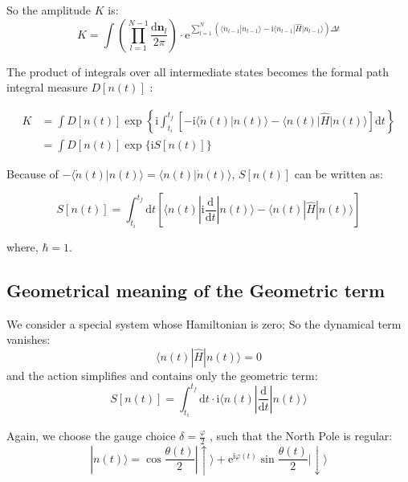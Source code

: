 So the amplitude $K$ is:
\begin{equation}
K = \int \left( \prod_{l=1}^{N-1} \frac{\mathrm{d}\bm{n}_l}{2\pi} \right) \cdot \mathrm{e}^{\sum_{l=1}^N (\langle \dot{n}_{l-1} | n_{l-1}\rangle - \mathrm{i} \langle n_{l-1} | \hat{H} | n_{l-1}\rangle) \Delta t}
\end{equation}

The product of integrals over all intermediate states becomes the formal path integral measure $D[n(t)]$ :

\begin{equation}
\begin{aligned}
K &= \int D[n(t)] \exp \left\{ \mathrm{i} \int_{t_i}^{t_f} [-\mathrm{i} \langle \dot{n}(t)|n(t)\rangle - \langle n(t)|\hat{H}|n(t)\rangle] \mathrm{d}t \right\} \\
&= \int D[n(t)] \exp \{ \mathrm{i} S[n(t)] \}
\end{aligned}
\end{equation}

Because of $-\langle \dot{n}(t)|n(t)\rangle = \langle n(t)|\dot{n}(t)\rangle$, $S[n(t)]$ can be written as:

\begin{equation}
S[n(t)] = \int_{t_i}^{t_f} \mathrm{d}t \left[ \langle n(t)| \mathrm{i} \frac{\mathrm{d}}{\mathrm{d}t} |n(t)\rangle - \langle n(t)|\hat{H}|n(t)\rangle \right]
\end{equation}

where, $\hbar=1$.



\subsection{Geometrical meaning of the Geometric term}

We consider a special system whose Hamiltonian is zero; So the dynamical term vanishes:
\begin{equation}
\langle n(t)|\hat{H}|n(t)\rangle = 0
\end{equation}
and the action simplifies and contains only the geometric term:
\begin{equation}
S[n(t)] = \int_{t_i}^{t_f} \mathrm{d}t \cdot \mathrm{i} \langle n(t)| \frac{\mathrm{d}}{\mathrm{d}t} |n(t)\rangle
\end{equation}

Again, we choose the gauge choice $\delta=\frac{\varphi}{2}$ , such that the North Pole is regular:
\begin{equation}
|n(t)\rangle = \cos\frac{\theta(t)}{2} |\uparrow\rangle + \mathrm{e}^{\mathrm{i}\varphi(t)} \sin\frac{\theta(t)}{2} |\downarrow\rangle
\end{equation}

